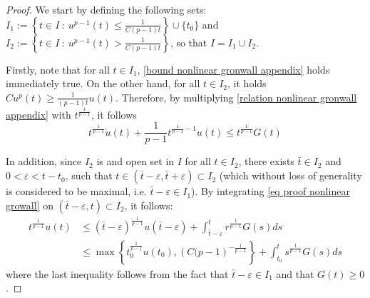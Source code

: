 \documentclass[10pt,a4paper]{amsart}
\begin{document}
\begin{proof} 
We start by defining the following sets: 
$I_{1}:=\left\{t\in I ~:~ u^{p-1}(t) \leq \frac{1}{C(p-1)t} \right\}\cup\{t_{0}\}$ and $I_{2}:= \left\{t\in I ~:~ u^{p-1}(t) > \frac{1}{C(p-1)t} \right\}$, so that $I=I_{1}\cup I_{2}$.

Firstly, note that for all $t\in I_{1}$, \eqref{bound nonlinear gronwall appendix} holds immediately true.
On the other hand, for all $t\in I_{2}$, it holds  $Cu^{p}(t) \geq \frac{1}{(p-1)t}u(t)$. Therefore, by multiplying \eqref{relation nonlinear gronwall appendix} with $t^{\frac{1}{p-1}}$, it follows
\begin{equation}\label{eq proof nonlinear growall}
	t^{\frac{1}{p-1}}\dot{u}(t) +\frac{1}{p-1}t^{\frac{1}{p-1}-1}u(t) \leq t^{\frac{1}{p-1}}G(t)
\end{equation}

In addition, since $I_{2}$ is and open set in $I$ for all $t\in I_{2}$, there exists $\bar{t} \in I_{2}$ and $0<\varepsilon<t-t_{0}$, such that $t\in (\bar{t}-\varepsilon,\bar{t}+\varepsilon)\subset I_{2}$ (which without loss of generality is considered to be maximal, i.e. $\bar{t}-\varepsilon \in I_{1}$). 
By integrating \eqref{eq proof nonlinear growall} on $(\bar{t}-\varepsilon,t)\subset I_{2}$, it follows:
\begin{equation}
	\begin{aligned}
	t^{\frac{1}{p-1}}u(t) & \leq (\bar{t}-\varepsilon)^{\frac{1}{p-1}}u(\bar{t}-\varepsilon) + \int_{\bar{t}-\varepsilon}^{t}r^{\frac{1}{p-1}}G(s)ds\\
	& \leq 	\max\left\{t_{0}^{\frac{1}{p-1}}u(t_{0}), \left(C(p-1\right)^{-\frac{1}{p-1}}\right\} +\int_{t_{0}}^{t}s^{\frac{1}{p-1}}G(s) ds
	\end{aligned}
\end{equation}	
where the last inequality follows from the fact that $\bar{t} - \varepsilon \in I_{1}$ and that $G(t)\geq 0$.
\end{proof}
\end{document}

